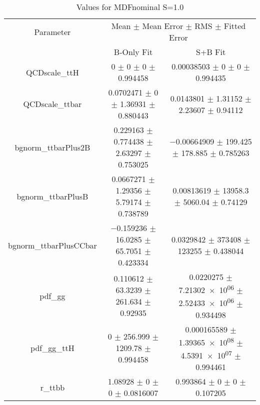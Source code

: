 \begin{table}
\centering
\caption{Values for MDFnominal S=1.0}
\begin{tabular}{ccc}
\toprule
Parameter & \multicolumn{2}{c}{Mean $\pm$ Mean Error $\pm$ RMS $\pm$ Fitted Error}\\
 & B-Only Fit & S+B Fit\\
\midrule
QCDscale\_ttH & \num{0} $\pm$ \num{0} $\pm$ \num{0} $\pm$ \num{0.994458} & \num{0.00038503} $\pm$ \num{0} $\pm$ \num{0} $\pm$ \num{0.994435}\\
QCDscale\_ttbar & \num{0.0702471} $\pm$ \num{0} $\pm$ \num{1.36931} $\pm$ \num{0.880443} & \num{0.0143801} $\pm$ \num{1.31152} $\pm$ \num{2.23607} $\pm$ \num{0.94112}\\
bgnorm\_ttbarPlus2B & \num{0.229163} $\pm$ \num{0.774438} $\pm$ \num{2.63297} $\pm$ \num{0.753025} & \num{-0.00664909} $\pm$ \num{199.425} $\pm$ \num{178.885} $\pm$ \num{0.785263}\\
bgnorm\_ttbarPlusB & \num{0.0667271} $\pm$ \num{1.29356} $\pm$ \num{5.79174} $\pm$ \num{0.738789} & \num{0.00813619} $\pm$ \num{13958.3} $\pm$ \num{5060.04} $\pm$ \num{0.74129}\\
bgnorm\_ttbarPlusCCbar & \num{-0.159236} $\pm$ \num{16.0285} $\pm$ \num{65.7051} $\pm$ \num{0.423334} & \num{0.0329842} $\pm$ \num{373408} $\pm$ \num{123255} $\pm$ \num{0.438044}\\
pdf\_gg & \num{0.110612} $\pm$ \num{63.3239} $\pm$ \num{261.634} $\pm$ \num{0.92935} & \num{0.0220275} $\pm$ \num{7.21302e+06} $\pm$ \num{2.52433e+06} $\pm$ \num{0.934498}\\
pdf\_gg\_ttH & \num{0} $\pm$ \num{256.999} $\pm$ \num{1209.78} $\pm$ \num{0.994458} & \num{0.000165589} $\pm$ \num{1.39365e+08} $\pm$ \num{4.5391e+07} $\pm$ \num{0.994461}\\
r\_ttbb & \num{1.08928} $\pm$ \num{0} $\pm$ \num{0} $\pm$ \num{0.0816007} & \num{0.993864} $\pm$ \num{0} $\pm$ \num{0} $\pm$ \num{0.107205}\\
\bottomrule
\end{tabular}
\end{table}